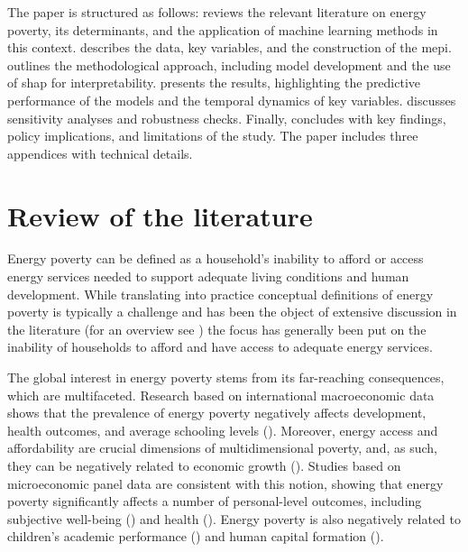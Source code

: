\documentclass[preprint,authoryear,12pt]{elsarticle}
\newcommand{\citeTwo}[1]{(\cite{#1})}
\begin{document}
The paper is structured as follows:  reviews the relevant literature on energy poverty, its determinants, and the application of machine learning methods in this context.  describes the data, key variables, and the construction of the \Gls{mepi}.  outlines the methodological approach, including model development and the use of \Gls{shap} for interpretability.  presents the results, highlighting the predictive performance of the models and the temporal dynamics of key variables.  discusses sensitivity analyses and robustness checks. Finally,  concludes with key findings, policy implications, and limitations of the study. The paper includes three appendices with technical details.


\section{Review of the literature} \label{Review_of_the_literature}

Energy poverty can be defined as a household’s inability to afford or access energy services needed to support adequate living conditions and human development. While translating into practice conceptual definitions of energy poverty is typically a challenge and has been the object of extensive discussion in the literature (for an overview see \citet{SM22}) the focus has generally been put on the inability of households to afford and have access to adequate energy services.

The global interest in energy poverty stems from its far-reaching consequences, which are multifaceted. Research based on international macroeconomic data shows that the prevalence of energy poverty negatively affects development, health outcomes, and average schooling levels \citeTwo{BMM21}. Moreover, energy access and affordability are crucial dimensions of multidimensional poverty, and, as such, they can be negatively related to economic growth \citeTwo{BL24}. Studies based on microeconomic panel data are consistent with this notion, showing that energy poverty significantly affects a number of personal-level outcomes, including subjective well-being \citeTwo{LO21} and health \citeTwo{ZSYW21,PEND24}. Energy poverty is also negatively related to children’s academic performance \citeTwo{ZAK21} and human capital formation \citeTwo{PK19}.
\end{document}
